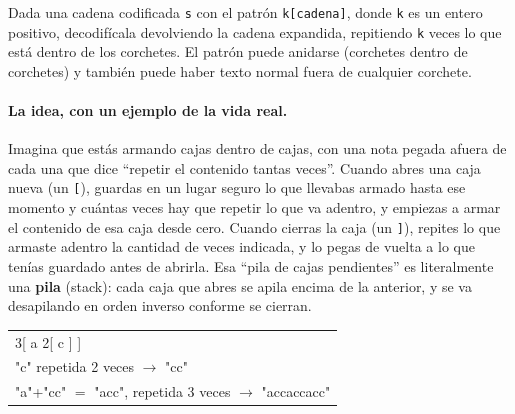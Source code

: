 
Dada una cadena codificada \texttt{s} con el patrón \texttt{k[cadena]},
donde \texttt{k} es un entero positivo, decodifícala devolviendo la cadena
expandida, repitiendo \texttt{k} veces lo que está dentro de los
corchetes. El patrón puede anidarse (corchetes dentro de corchetes) y
también puede haber texto normal fuera de cualquier corchete.

\paragraph{La idea, con un ejemplo de la vida real.} Imagina que estás
armando cajas dentro de cajas, con una nota pegada afuera de cada una que
dice ``repetir el contenido tantas veces''. Cuando abres una caja nueva
(un \texttt{[}), guardas en un lugar seguro lo que llevabas armado hasta
ese momento y cuántas veces hay que repetir lo que va adentro, y empiezas a
armar el contenido de esa caja desde cero. Cuando cierras la caja (un
\texttt{]}), repites lo que armaste adentro la cantidad de veces indicada,
y lo pegas de vuelta a lo que tenías guardado antes de abrirla. Esa ``pila
de cajas pendientes'' es literalmente una \textbf{pila} (stack): cada caja
que abres se apila encima de la anterior, y se va desapilando en orden
inverso conforme se cierran.

\begin{center}
\ttfamily
\begin{tabular}{l}
3[ a 2[ c ] ]\\
"c" repetida 2 veces $\to$ "cc"\\
"a"+"cc" $=$ "acc", repetida 3 veces $\to$ "accaccacc"\\
\end{tabular}
\end{center}

